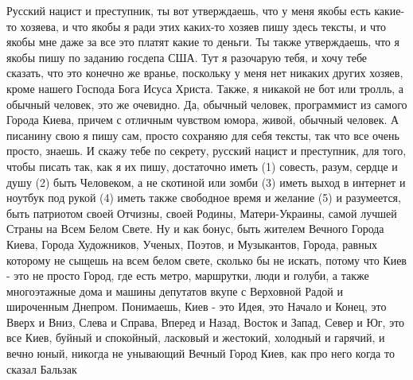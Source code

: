 
 
 
 
 

Русский нацист и преступник, ты вот утверждаешь, что у меня якобы есть какие-то
хозяева, и что якобы я ради этих каких-то хозяев пишу здесь тексты, и что якобы
мне даже за все это платят какие то деньги. Ты также утверждаешь, что я якобы
пишу по заданию госдепа США. Тут я разочарую тебя, и хочу тебе сказать, что это
конечно же вранье, поскольку у меня нет никаких других хозяев, кроме нашего
Господа Бога Исуса Христа.  Также, я никакой не бот или тролль, а обычный
человек, это же очевидно.  Да, обычный человек, программист из самого Города
Киева, причем с отличным чувством юмора, живой, обычный человек.  А писанину
свою я пишу сам, просто сохраняю для себя тексты, так что все очень просто,
знаешь. И скажу тебе по секрету, русский нацист и преступник, для того, чтобы
писать так, как я их пишу, достаточно иметь (1) совесть, разум, сердце и душу
(2) быть Человеком, а не скотиной или зомби (3) иметь выход в интернет и
ноутбук под рукой (4) иметь также свободное время и желание (5) и разумеется,
быть патриотом своей Отчизны, своей Родины, Матери-Украины, самой лучшей Страны
на Всем Белом Свете. Ну и как бонус, быть жителем Вечного Города Киева, Города
Художников, Ученых, Поэтов, и Музыкантов, Города, равных которому не сыщешь на
всем белом свете, сколько бы не искать, потому что Киев - это не просто Город,
где есть метро, маршрутки, люди и голуби, а также многоэтажные дома и машины
депутатов вкупе с Верховной Радой и широченным Днепром. Понимаешь, Киев - это
Идея, это Начало и Конец, это Вверх и Вниз, Слева и Справа, Вперед и Назад,
Восток и Запад, Север и Юг, это все Киев, буйный и спокойный, ласковый и
жестокий, холодный и гарячий, и вечно юный, никогда не унывающий Вечный Город
Киев, как про него когда то сказал Бальзак

